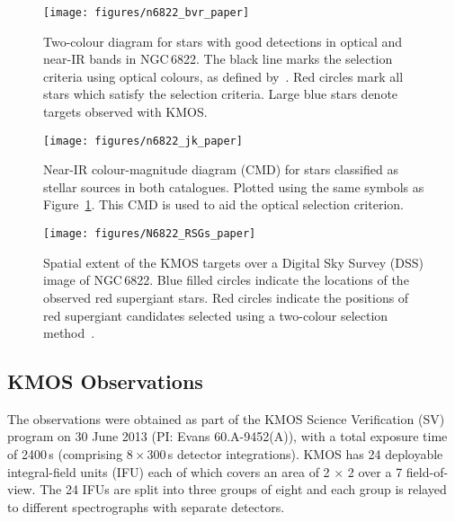 \documentclass[manuscript]{aastex}
\begin{document}
\begin{figure}
 \texttt{[image: figures/n6822\_bvr\_paper]}
 \caption{
          Two-colour diagram for stars with good detections in optical and near-IR bands in NGC\,6822.
          The black line marks the selection criteria using optical colours, as defined by~\protect\cite{Levesque12}.
          Red circles mark all stars which satisfy the selection criteria.
          Large blue stars denote targets observed with KMOS.
         }
 \label{fig:BVR}
\end{figure}

\begin{figure}
 \texttt{[image: figures/n6822\_jk\_paper]}
 \caption{
          Near-IR colour-magnitude diagram (CMD) for stars classified as stellar sources in both catalogues.
          Plotted using the same symbols as Figure~\ref{fig:BVR}.
          This CMD is used to aid the optical selection criterion.
         }
 \label{fig:JK}
\end{figure}


\begin{figure}
 \texttt{[image: figures/N6822\_RSGs\_paper]}
 \caption{Spatial extent of the KMOS targets over a Digital Sky Survey (DSS) image of NGC\,6822.
          Blue filled circles indicate the locations of the observed red supergiant stars.
          Red circles indicate the positions of red supergiant candidates selected using a two-colour selection method~\citep{Levesque12}.
          }
 \label{fig:N6822}
\end{figure}


\subsection{KMOS Observations} %
\label{sub:observations}

The observations were obtained as part of the KMOS Science Verification (SV) program on 30 June 2013 (PI: Evans 60.A-9452(A)),
with a total exposure time of 2400\,s
(comprising 8\,$\times$\,300\,s detector integrations).
KMOS has 24 deployable integral-field units (IFU) each of which covers an area of
2 $\times$ 2 over a 7 field-of-view.
The 24 IFUs are split into three groups of eight and each group is relayed to different spectrographs with separate detectors.
\end{document}
